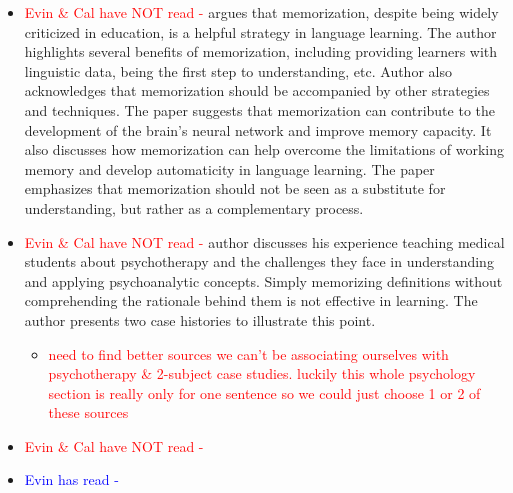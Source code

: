 \documentclass{article}
\begin{document}
\begin{itemize}
\begin{itemize}
        \item \textcolor{red}{Evin \& Cal have NOT read - } \cite{nasrollahi2015memorization} argues that memorization, despite being widely criticized in education, is a helpful strategy in language learning. The author highlights several benefits of memorization, including providing learners with linguistic data, being the first step to understanding, etc. Author also acknowledges that memorization should be accompanied by other strategies and techniques. The paper suggests that memorization can contribute to the development of the brain's neural network and improve memory capacity. It also discusses how memorization can help overcome the limitations of working memory and develop automaticity in language learning. The paper emphasizes that memorization should not be seen as a substitute for understanding, but rather as a complementary process.
        \item \textcolor{red}{Evin \& Cal have NOT read - } \cite{brafman2003memorizing} author discusses his experience teaching medical students about psychotherapy and the challenges they face in understanding and applying psychoanalytic concepts. Simply memorizing definitions without comprehending the rationale behind them is not effective in learning. The author presents two case histories to illustrate this point.
        \begin{itemize}
            \item \textcolor{red}{need to find better sources we can't be associating ourselves with psychotherapy \& 2-subject case studies. luckily this whole psychology section is really only for one sentence so we could just choose 1 or 2 of these sources}
        \end{itemize}
        \item \textcolor{red}{Evin \& Cal have NOT read - }
        \item \textcolor{blue}{Evin has read -}
    \end{itemize}


\end{itemize}
\end{document}
